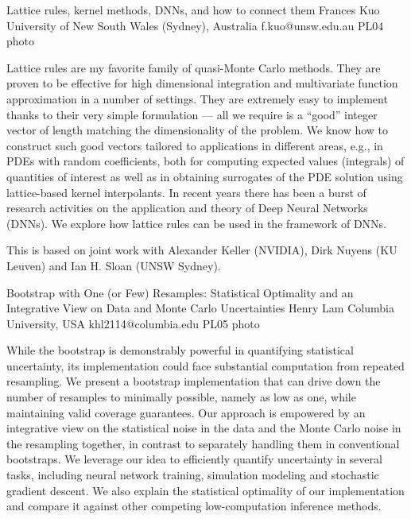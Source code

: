 \documentclass[12pt,a4paper,figuresright]{book}
\begin{document}
\begin{talk}
 {Lattice rules, kernel methods, DNNs, and how to connect them}%
 {Frances Kuo}%
 {University of New South Wales (Sydney), Australia}%
 {f.kuo@unsw.edu.au}%
 {}%
 {}%
 {}%
 {PL04}%
 {photo}%

Lattice rules are my favorite family of quasi-Monte Carlo methods. They are proven to be effective for high dimensional integration and multivariate function approximation in a number of settings. They are extremely easy to implement thanks to their very simple formulation --- all we require is a ``good'' integer vector of length matching the dimensionality of the problem. We know how to construct such good vectors tailored to applications in different areas, e.g., in PDEs with random coefficients, both for computing expected values (integrals) of quantities of interest as well as in obtaining surrogates of the PDE solution using lattice-based kernel interpolants. In recent years there has been a burst of research activities on the application and theory of Deep Neural Networks (DNNs). We explore how lattice rules can be used in the framework of DNNs.

This is based on joint work with Alexander Keller (NVIDIA), Dirk Nuyens (KU Leuven) and Ian H. Sloan (UNSW Sydney). 
\end{talk}

\clearpage

\begin{talk}
 {Bootstrap with One (or Few) Resamples: Statistical Optimality and an Integrative View on Data and Monte Carlo Uncertainties}%
 {Henry Lam}%
 {Columbia University, USA}%
 {khl2114@columbia.edu}%
 {}%
 {}%
 {}%
 {PL05}%
 {photo}%
 
While the bootstrap is demonstrably powerful in quantifying statistical uncertainty, its implementation could face substantial computation from repeated resampling. We present a bootstrap implementation that can drive down the number of resamples to minimally possible, namely as low as one, while maintaining valid coverage guarantees. Our approach is empowered by an integrative view on the statistical noise in the data and the Monte Carlo noise in the resampling together, in contrast to separately handling them in conventional bootstraps. We leverage our idea to efficiently quantify uncertainty in several tasks, including neural network training, simulation modeling and stochastic gradient descent. We also explain the statistical optimality of our implementation and compare it against other competing low-computation inference methods.
\end{talk}
\end{document}
